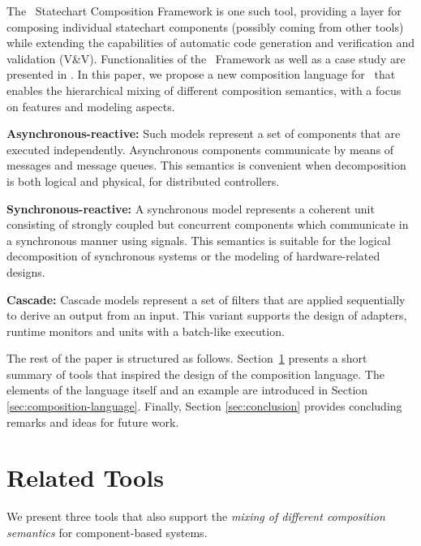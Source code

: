 The \gamma\ Statechart Composition Framework is one such tool, providing a layer for composing individual statechart components (possibly coming from other tools) while extending the capabilities of automatic code generation and verification and validation (V\&V). Functionalities of the \gamma\ Framework as well as a case study are presented in \cite{graics-bence-bsc}. In this paper, we propose a new composition language for \gamma\ that enables the hierarchical mixing of different composition semantics, with a focus on features and modeling aspects.

\textbf{Asynchronous-reactive:} Such models represent a set of components that are executed independently. Asynchronous components communicate by means of messages and message queues. This semantics is convenient when decomposition is both logical and physical, \eg for distributed controllers.
	
\textbf{Synchronous-reactive:} A synchronous model represents a coherent unit consisting of strongly coupled but concurrent components which communicate in a synchronous manner using signals. This semantics is suitable for the logical decomposition of synchronous systems or the modeling of hardware-related designs.
	
\textbf{Cascade:} Cascade models represent a set of filters that are applied sequentially to derive an output from an input. This variant supports the design of adapters, runtime monitors and units with a batch-like execution.


The rest of the paper is structured as follows. Section~\ref{sec:related-tools} presents a short summary of tools that inspired the design of the composition language. The elements of the language itself and an example are introduced in Section \ref{sec:composition-language}. Finally, Section \ref{sec:conclusion} provides concluding remarks and ideas for future work.

\section{Related Tools}
\label{sec:related-tools}

We present three tools that also support the \emph{mixing of different composition semantics} for component-based systems.

